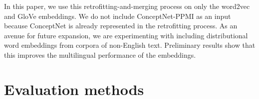 \documentclass[letterpaper]{article}
\begin{document}




In this paper, we use this retrofitting-and-merging process on only the
word2vec and GloVe embeddings. We do not include ConceptNet-PPMI as an input
because ConceptNet is already represented in the retrofitting process. As an
avenue for future expansion, we are experimenting with including distributional
word embeddings from corpora of non-English text. Preliminary results show that
this improves the multilingual performance of the embeddings.

\section{Evaluation methods}
\end{document}
